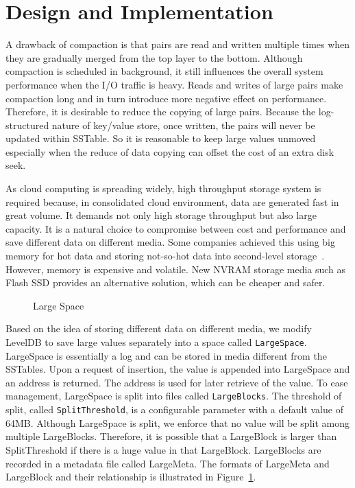\section{Design and Implementation}
\label{sec:implementation}


A drawback of compaction is that pairs are read and written multiple
times when they are gradually merged from the top layer to the bottom.
Although compaction is scheduled in background, it still influences
the overall system performance when the I/O traffic is heavy. Reads
and writes of large pairs make compaction long and in turn introduce
more negative effect on performance. Therefore, it is desirable to
reduce the copying of large pairs. Because the log-structured nature
of key/value store, once written, the pairs will never be updated
within SSTable. So it is reasonable to keep large values unmoved
especially when the reduce of data copying can offset the cost of an
extra disk seek.

As cloud computing is spreading widely, high throughput storage system
is required because, in consolidated cloud environment, data are
generated fast in great volume. It demands not only high storage
throughput but also large capacity. It is a natural choice to
compromise between cost and performance and save different data on
different media. Some companies achieved this using big memory for hot
data and storing not-so-hot data into second-level
storage~\cite{level_lifetime}.  However, memory is expensive and
volatile. New NVRAM storage media such as Flash SSD provides an
alternative solution, which can be cheaper and safer.

\begin{figure}[t]
\begin{centering}
\caption{Large Space}
\label{fig:space}
\end{centering}
\end{figure}

Based on the idea of storing different data on different media, we
modify LevelDB to save large values separately into a space called
\texttt{LargeSpace}. LargeSpace is essentially a log and can be stored
in media different from the SSTables. Upon a request of insertion, the
value is appended into LargeSpace and an address is returned. The
address is used for later retrieve of the value. To ease management,
LargeSpace is split into files called \texttt{LargeBlocks}. The
threshold of split, called \texttt{SplitThreshold}, is a configurable
parameter with a default value of 64MB. Although LargeSpace is split,
we enforce that no value will be split among multiple LargeBlocks.
Therefore, it is possible that a LargeBlock is larger than
SplitThreshold if there is a huge value in that LargeBlock.
LargeBlocks are recorded in a metadata file called LargeMeta. The
formats of LargeMeta and LargeBlock and their relationship is
illustrated in Figure~\ref{fig:space}.

